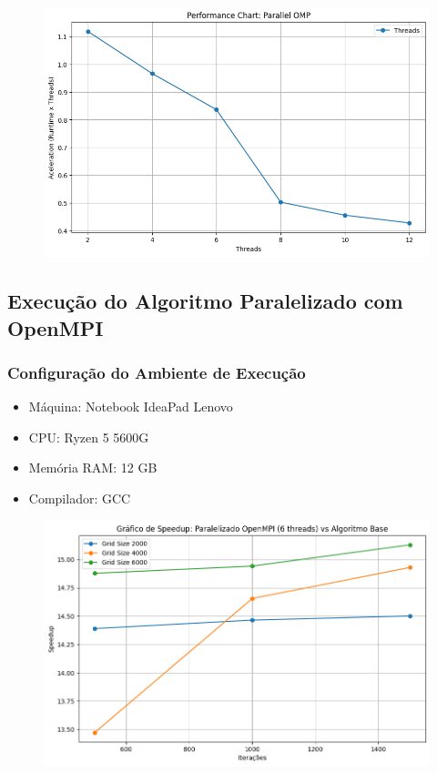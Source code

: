 \begin{figure}[H]
    \centering
    \includegraphics[width=1\linewidth]{./image copy 3.png}
    \label{fig:Runtimexblock}
\end{figure}

\subsection{Execução do Algoritmo Paralelizado com OpenMPI}
\subsubsection{Configuração do Ambiente de Execução}
\begin{itemize}
    \item Máquina: Notebook IdeaPad Lenovo
    \item CPU: Ryzen 5 5600G
    \item Memória RAM: 12 GB
    \item Compilador: GCC
\end{itemize}

\begin{figure}[H]
    \centering
    \includegraphics[width=1\linewidth]{./image copy 2.png}
    \label{fig:Runtimexblock}
\end{figure}

